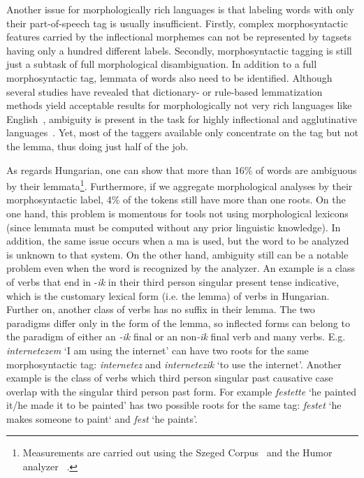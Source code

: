 Another issue for morphologically rich languages is that labeling words with only their part-of-speech tag is usually insufficient. 
Firstly, complex morphosyntactic features carried by the inflectional morphemes can not be represented by tagsets having only a hundred different labels. 
Secondly, morphosyntactic tagging is still just a subtask of full morphological disambiguation. 
In addition to a full morphosyntactic tag, lemmata of words also need to be identified. Although several studies have revealed that dictionary- or rule-based lemmatization methods yield acceptable results for morphologically not very rich languages like English~\cite{Porter1980,Plisson2004}, ambiguity is present in the task for highly inflectional and agglutinative languages~\cite{Jursic2007,Sak2007,Chrupaa2008}. 
Yet, most of the taggers available only concentrate on the tag but not the lemma, thus doing just half of the job.

As regards Hungarian, one can show that more than 16\% of words are ambiguous by their lemmata\footnote{Measurements are carried out using the  Szeged Corpus~\cite{Csendes2004} and the Humor analyzer ~\cite{Proszeky1994,Novak2003,Proszeky2005}.}. 
Furthermore, if we aggregate morphological analyses by their morphosyntactic label, 4\% of the tokens still have more than one roots. 
On the one hand, this problem is momentous for tools not using morphological lexicons (since lemmata must be computed without any prior linguistic knowledge). 
In addition, the same issue occurs when a \acrshort{ma} is used, but the word to be analyzed is unknown to that system.
On the other hand, ambiguity still can be a notable problem even when the word is recognized by the analyzer.
An example is a class of verbs that end in -\emph{ik} in their third person singular present tense indicative, which is the customary lexical form (i.e. the lemma) of verbs in Hungarian. Further on, another class of verbs has no suffix in their lemma. 
The two paradigms differ only in the form of the lemma, so inflected forms can belong to the paradigm of either an \emph{-ik} final or an non\emph{-ik} final verb and many verbs. 
E.g. \emph{internetezem} `I am using the internet' can have two roots for the same morphosyntactic tag: \emph{internetez} and \emph{internetezik} `to use the internet'.
Another example is the class of verbs which third person singular past causative case overlap with the singular third person past form. 
For example \emph{festette} `he painted it/he made it to be painted' has two possible roots for the same tag: \emph{festet} `he makes someone to paint` and \emph{fest} `he paints'.  %

